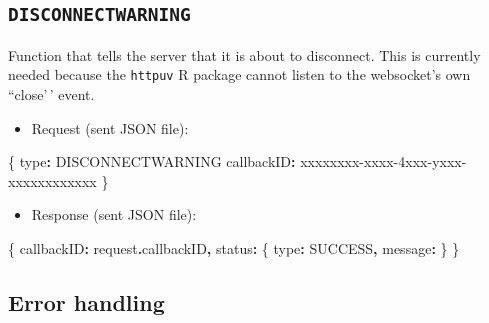 \documentclass[
]{book}
\newenvironment{Shaded}{\begin{snugshade}}{\end{snugshade}}
\newcommand{\AttributeTok}[1]{\textcolor[rgb]{0.77,0.63,0.00}{#1}}
\newcommand{\NormalTok}[1]{#1}
\newcommand{\OperatorTok}[1]{\textcolor[rgb]{0.81,0.36,0.00}{\textbf{#1}}}
\newcommand{\StringTok}[1]{\textcolor[rgb]{0.31,0.60,0.02}{#1}}
\providecommand{\tightlist}{%
  \setlength{\itemsep}{0pt}\setlength{\parskip}{0pt}}
\begin{document}
\hypertarget{disconnectwarning}{%
\subsection{\texorpdfstring{\texttt{DISCONNECTWARNING}}{DISCONNECTWARNING}}\label{disconnectwarning}}

Function that tells the server that it is about to disconnect. This is currently needed because the \texttt{httpuv} R package cannot listen to the websocket's own ``close'\,' event.

\begin{itemize}
\tightlist
\item
  Request (sent JSON file):
\end{itemize}

\begin{Shaded}
\begin{Highlighting}[]
\NormalTok{\{}
  \StringTok{\textquotesingle{}type\textquotesingle{}}\OperatorTok{:} \StringTok{\textquotesingle{}DISCONNECTWARNING\textquotesingle{}}
  \StringTok{\textquotesingle{}callbackID\textquotesingle{}}\OperatorTok{:} \StringTok{\textquotesingle{}xxxxxxxx{-}xxxx{-}4xxx{-}yxxx{-}xxxxxxxxxxxx\textquotesingle{}}
\NormalTok{\}}
\end{Highlighting}
\end{Shaded}

\begin{itemize}
\tightlist
\item
  Response (sent JSON file):
\end{itemize}

\begin{Shaded}
\begin{Highlighting}[]
\NormalTok{\{}
  \StringTok{\textquotesingle{}callbackID\textquotesingle{}}\OperatorTok{:}\NormalTok{ request}\OperatorTok{.}\AttributeTok{callbackID}\OperatorTok{,}
  \StringTok{\textquotesingle{}status\textquotesingle{}}\OperatorTok{:}\NormalTok{ \{}
    \StringTok{\textquotesingle{}type\textquotesingle{}}\OperatorTok{:} \StringTok{\textquotesingle{}SUCCESS\textquotesingle{}}\OperatorTok{,}
    \StringTok{\textquotesingle{}message\textquotesingle{}}\OperatorTok{:} \StringTok{\textquotesingle{}\textquotesingle{}}
\NormalTok{  \}}
\NormalTok{\}}
\end{Highlighting}
\end{Shaded}

\hypertarget{error-handling}{%
\subsection{Error handling}\label{error-handling}}
\end{document}
